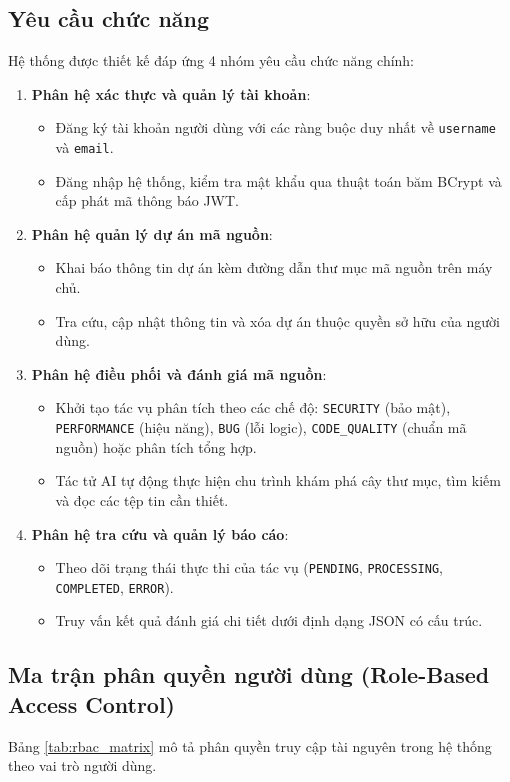 \documentclass[12pt,a4paper]{report}
\begin{document}
\subsection{Yêu cầu chức năng}
Hệ thống được thiết kế đáp ứng 4 nhóm yêu cầu chức năng chính:
\begin{enumerate}
    \item \textbf{Phân hệ xác thực và quản lý tài khoản}:
    \begin{itemize}
        \item Đăng ký tài khoản người dùng với các ràng buộc duy nhất về \texttt{username} và \texttt{email}.
        \item Đăng nhập hệ thống, kiểm tra mật khẩu qua thuật toán băm BCrypt và cấp phát mã thông báo JWT.
    \end{itemize}
    \item \textbf{Phân hệ quản lý dự án mã nguồn}:
    \begin{itemize}
        \item Khai báo thông tin dự án kèm đường dẫn thư mục mã nguồn trên máy chủ.
        \item Tra cứu, cập nhật thông tin và xóa dự án thuộc quyền sở hữu của người dùng.
    \end{itemize}
    \item \textbf{Phân hệ điều phối và đánh giá mã nguồn}:
    \begin{itemize}
        \item Khởi tạo tác vụ phân tích theo các chế độ: \texttt{SECURITY} (bảo mật), \texttt{PERFORMANCE} (hiệu năng), \texttt{BUG} (lỗi logic), \texttt{CODE\_QUALITY} (chuẩn mã nguồn) hoặc phân tích tổng hợp.
        \item Tác tử AI tự động thực hiện chu trình khám phá cây thư mục, tìm kiếm và đọc các tệp tin cần thiết.
    \end{itemize}
    \item \textbf{Phân hệ tra cứu và quản lý báo cáo}:
    \begin{itemize}
        \item Theo dõi trạng thái thực thi của tác vụ (\texttt{PENDING}, \texttt{PROCESSING}, \texttt{COMPLETED}, \texttt{ERROR}).
        \item Truy vấn kết quả đánh giá chi tiết dưới định dạng JSON có cấu trúc.
    \end{itemize}
\end{enumerate}

\subsection{Ma trận phân quyền người dùng (Role-Based Access Control)}
Bảng \ref{tab:rbac_matrix} mô tả phân quyền truy cập tài nguyên trong hệ thống theo vai trò người dùng.
\end{document}
